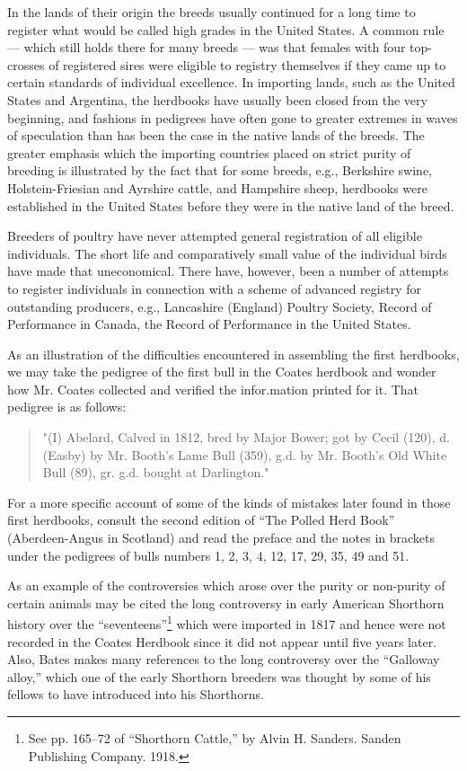 In the lands of their origin the breeds usually continued for a long time to register what would be called high grades in 
the United States. A common rule --- which still holds there for many breeds --- was that females with four top-crosses of 
registered sires were eligible to registry themselves if they came up to certain standards of individual excellence. In 
importing lands, such as the United States and Argentina, the herdbooks have usually been closed from the very beginning, 
and fashions in pedigrees have often gone to greater extremes in waves of speculation than has been the case in the native 
lands of the breeds. The greater emphasis which the importing countries placed on strict purity of breeding is illustrated 
by the fact that for some breeds, e.g., Berkshire swine, Holstein-Friesian and Ayrshire cattle, and Hampshire sheep, 
herdbooks were established in the United States before they were in the native land of the breed.

Breeders of poultry have never attempted general registration of all eligible individuals. The short life and comparatively 
small value of the individual birds have made that uneconomical. There have, however, been a number of attempts to register 
individuals in connection with a scheme of advanced registry for outstanding producers, e.g., Lancashire (England) Poultry 
Society, Record of Performance in Canada, the Record of Performance in the United States.

As an illustration of the difficulties encountered in assembling the first herdbooks, we may take the pedigree of the first bull in the Coates herdbook and wonder how Mr. Coates collected and verified the infor.mation printed for it. That pedigree is as follows: 

\begin{quote}
"(I) Abelard, Calved in 1812, bred by Major Bower; got by Cecil (120), d. (Easby) by Mr. Booth's Lame Bull (359), g.d. by Mr. Booth's Old White Bull (89), gr. g.d. bought at Darlington."
\end{quote}

\noindent
For a more specific account of some of the kinds of mistakes later found in those first herdbooks, consult the second 
edition of ``The Polled Herd Book'' (Aberdeen-Angus in Scotland) and read the preface and the notes in brackets under the 
pedigrees of bulls numbers 1, 2, 3, 4, 12, 17, 29, 35, 49 and 51. 

As an example of the controversies which arose over the purity or non-purity of certain animals may be cited the long 
controversy in early American Shorthorn history over the ``seventeens''\footnote{See pp. 165--72 of ``Shorthorn Cattle,'' by 
Alvin H. Sanders. Sanden Publishing Company. 1918.} which were imported in 1817 and hence were not recorded in the Coates 
Herdbook since it did not appear until five years later. Also, Bates makes many references to the long controversy over the 
``Galloway alloy,'' which one of the early Shorthorn breeders was thought by some of his fellows to have introduced into 
his Shorthorns. 

